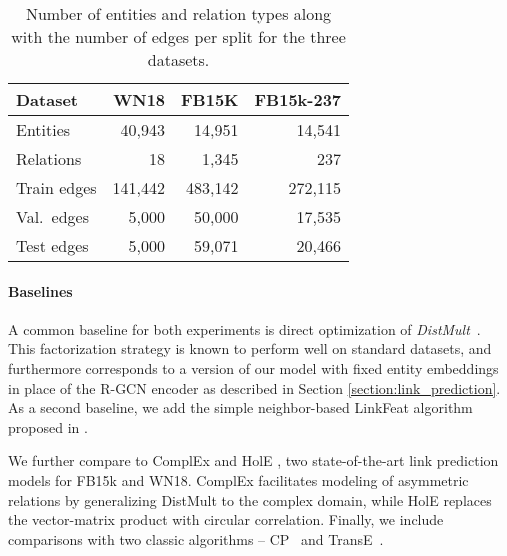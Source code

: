 \begin{table}[ht]
\centering
\begin{tabular}{lrrr}
\toprule
Dataset & WN18 & FB15K & FB15k-237\\ \midrule
Entities    & 40,943  & 14,951 & 14,541\\
Relations   & 18 & 1,345 & 237\\
Train edges & 141,442 & 483,142 & 272,115\\
Val.~edges & 5,000 & 50,000 & 17,535\\
Test edges & 5,000 & 59,071 & 20,466\\ \bottomrule
\end{tabular}
\caption{Number of entities and relation types along with the number of edges per split for the three datasets.\label{table:datasets}}
\end{table}

\paragraph{Baselines}
A common baseline for both experiments is direct optimization of \textit{DistMult}~\cite{distmult-embedding_entities_and_relations}. This factorization strategy is known to perform well on standard datasets, and furthermore corresponds to a version of our model with fixed entity embeddings in place of the R-GCN encoder as described in Section \ref{section:link_prediction}. As a second baseline, we add the simple neighbor-based LinkFeat algorithm proposed in \citet{toutanova2015observed}.

We further compare to ComplEx \cite{complex-complex_embeddings_for_simple_link_prediction} and HolE \cite{nickel2015holographic}, two state-of-the-art link prediction models for FB15k and WN18. ComplEx facilitates modeling of asymmetric relations by generalizing DistMult to the complex domain, while HolE replaces the vector-matrix product with circular correlation. Finally, we include comparisons with two classic algorithms -- CP~\cite{hitchcock1927expression} and TransE~\cite{bordes2013translating}.

